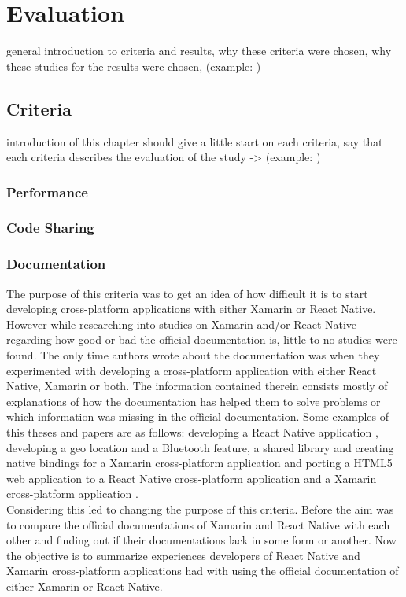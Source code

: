 \documentclass[Bachelor,BIF,english]{twbook}
\begin{document}
\chapter{Evaluation}
general introduction to criteria and results, why these criteria were chosen, why these studies for the results were chosen, (example: \cite[p.~24]{Danielsson_2016})

\section{Criteria}
introduction of this chapter should give a little start on each criteria, say that each criteria describes the evaluation of the study -> (example: \cite[p.~24]{Danielsson_2016})

\subsection{Performance}
\cite[p.~25-26]{Danielsson_2016} \cite[p.~30]{Axelsson2016} \cite[p.~29-31]{Hansson_Vidhall_2016}

\subsection{Code Sharing}
\cite[p.~31]{Hansson_Vidhall_2016}

\subsection{Documentation}
The purpose of this criteria was to get an idea of how difficult it is to start developing cross-platform applications with either Xamarin or React Native. However while researching into studies on Xamarin and/or React Native regarding how good or bad the official documentation is, little to no studies were found. The only time authors wrote about the documentation was when they experimented with developing a cross-platform application with either React Native, Xamarin or both. The information contained therein consists mostly of explanations of how the documentation has helped them to solve problems or which information was missing in the official documentation. Some examples of this theses and papers are as follows: developing a React Native application \cite[p.~16-18]{Danielsson_2016}, developing a geo location and a Bluetooth feature, a shared library and creating native bindings for a Xamarin cross-platform application \cite[p.~10-15]{Dickson_2013} and porting a HTML5 web application to a React Native cross-platform application and a Xamarin cross-platform application \cite[p.~33-69]{ZubaBernhard2017EdPb}.
\\[\baselineskip]
Considering this led to changing the purpose of this criteria. Before the aim was to compare the official documentations of Xamarin and React Native with each other and finding out if their documentations lack in some form or another. Now the objective is to summarize experiences developers of React Native and Xamarin cross-platform applications had with using the official documentation of either Xamarin or React Native. 
\end{document}
